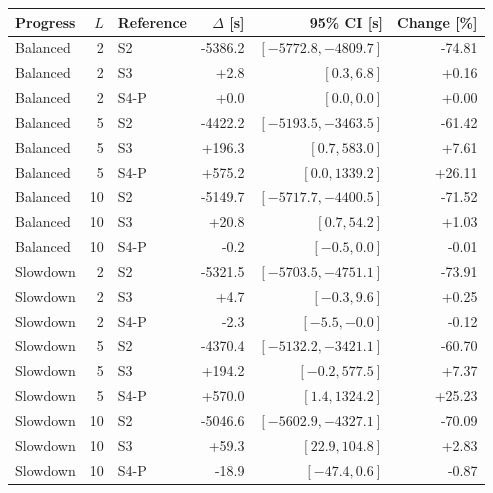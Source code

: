 \begin{tabular}{lrlrrr}\toprule
Progress & $L$ & Reference & $\Delta$ [s] & 95\% CI [s] & Change [\%]\\\midrule
Balanced & 2 & S2 & -5386.2 & $[-5772.8, -4809.7]$ & -74.81\\
Balanced & 2 & S3 & +2.8 & $[0.3, 6.8]$ & +0.16\\
Balanced & 2 & S4-P & +0.0 & $[0.0, 0.0]$ & +0.00\\
Balanced & 5 & S2 & -4422.2 & $[-5193.5, -3463.5]$ & -61.42\\
Balanced & 5 & S3 & +196.3 & $[0.7, 583.0]$ & +7.61\\
Balanced & 5 & S4-P & +575.2 & $[0.0, 1339.2]$ & +26.11\\
Balanced & 10 & S2 & -5149.7 & $[-5717.7, -4400.5]$ & -71.52\\
Balanced & 10 & S3 & +20.8 & $[0.7, 54.2]$ & +1.03\\
Balanced & 10 & S4-P & -0.2 & $[-0.5, 0.0]$ & -0.01\\
Slowdown & 2 & S2 & -5321.5 & $[-5703.5, -4751.1]$ & -73.91\\
Slowdown & 2 & S3 & +4.7 & $[-0.3, 9.6]$ & +0.25\\
Slowdown & 2 & S4-P & -2.3 & $[-5.5, -0.0]$ & -0.12\\
Slowdown & 5 & S2 & -4370.4 & $[-5132.2, -3421.1]$ & -60.70\\
Slowdown & 5 & S3 & +194.2 & $[-0.2, 577.5]$ & +7.37\\
Slowdown & 5 & S4-P & +570.0 & $[1.4, 1324.2]$ & +25.23\\
Slowdown & 10 & S2 & -5046.6 & $[-5602.9, -4327.1]$ & -70.09\\
Slowdown & 10 & S3 & +59.3 & $[22.9, 104.8]$ & +2.83\\
Slowdown & 10 & S4-P & -18.9 & $[-47.4, 0.6]$ & -0.87\\
\bottomrule\end{tabular}
